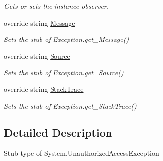 \begin{DoxyCompactItemize}
\begin{DoxyCompactList}\small\item\em Gets or sets the instance observer.\end{DoxyCompactList}\item 
override string \hyperlink{class_system_1_1_fakes_1_1_stub_unauthorized_access_exception_aa8af6cd787cd996a01660351565dc0e9}{Message}
\begin{DoxyCompactList}\small\item\em Sets the stub of Exception.\-get\-\_\-\-Message()\end{DoxyCompactList}\item 
override string \hyperlink{class_system_1_1_fakes_1_1_stub_unauthorized_access_exception_a95c363c2f38fceee6220244974b0b439}{Source}
\begin{DoxyCompactList}\small\item\em Sets the stub of Exception.\-get\-\_\-\-Source()\end{DoxyCompactList}\item 
override string \hyperlink{class_system_1_1_fakes_1_1_stub_unauthorized_access_exception_a90dbdd3febdf1fd2d1d5a5a72461fff2}{Stack\-Trace}
\begin{DoxyCompactList}\small\item\em Sets the stub of Exception.\-get\-\_\-\-Stack\-Trace()\end{DoxyCompactList}\end{DoxyCompactItemize}


\subsection{Detailed Description}
Stub type of System.\-Unauthorized\-Access\-Exception



